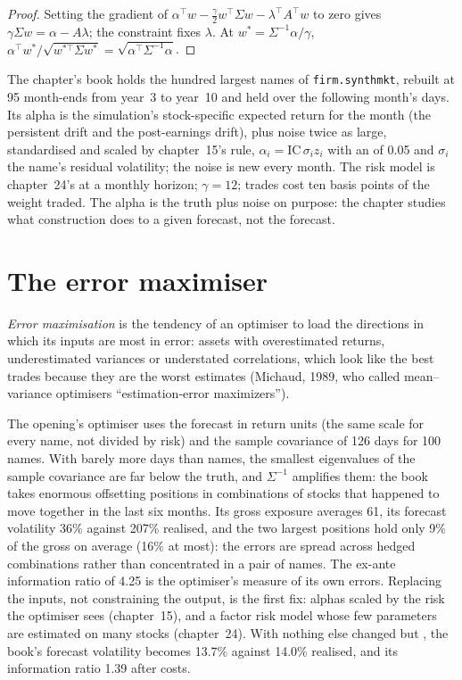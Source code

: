 \begin{proof}
Setting the gradient of $\alpha^\top w - \frac\gamma2 w^\top\Sigma w - \lambda^\top A^\top w$ to zero gives $\gamma\Sigma w = \alpha - A\lambda$; the constraint fixes
$\lambda$. At $w^* = \Sigma^{-1}\alpha/\gamma$, $\alpha^\top w^*/\sqrt{w^{*\top}\Sigma w^*} = \sqrt{\alpha^\top\Sigma^{-1}\alpha}$.
\end{proof}

The chapter's book holds the hundred largest names of \texttt{firm.synthmkt}, rebuilt at 95 month-ends from year~3 to year~10 and held over the following month's
days. Its alpha is the simulation's stock-specific expected return for the month (the persistent drift and the post-earnings drift), plus noise twice as large,
standardised and scaled by chapter~15's rule, $\alpha_i = \mathrm{IC}\,\sigma_i z_i$ with an  of 0.05 and $\sigma_i$ the name's residual
volatility; the noise is new every month. The risk model is chapter~24's at a monthly horizon; $\gamma = 12$; trades cost ten basis points of the weight traded.
The alpha is the truth plus noise on purpose: the chapter studies what construction does to a given forecast, not the forecast.

\section{The error maximiser}

\begin{definition}\label{def:rs:portfolio-construction-i:error}
\emph{Error maximisation} is the tendency of an optimiser to load the directions in which its inputs are most in error: assets with
overestimated returns, underestimated variances or understated correlations, which look like the best trades because they are the worst estimates (Michaud,
1989, who called mean--variance optimisers ``estimation-error maximizers'').
\end{definition}

The opening's optimiser uses the forecast in return units (the same scale for every name, not divided by risk) and the sample covariance of 126 days for 100
names. With barely more days than names, the smallest eigenvalues of the sample covariance are far below the truth, and $\Sigma^{-1}$ amplifies them: the book
takes enormous offsetting positions in combinations of stocks that happened to move together in the last six months. Its gross exposure averages 61, its
forecast volatility 36\% against 207\% realised, and the two largest positions hold only 9\% of the gross on average (16\% at most): the errors are spread across
hedged combinations rather than concentrated in a pair of names. The ex-ante information ratio of 4.25 is the optimiser's measure of its own errors. Replacing
the inputs, not constraining the output, is the first fix: alphas scaled by the risk the optimiser sees (chapter~15), and a factor risk model whose few
parameters are estimated on many stocks (chapter~24). With nothing else changed but , the book's forecast volatility becomes 13.7\% against
14.0\% realised, and its information ratio 1.39 after costs.

